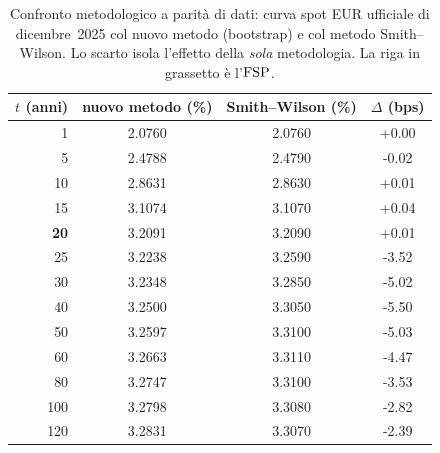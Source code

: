 \begin{table}[H]\centering\small
\caption{Confronto metodologico a parit\`a di dati: curva spot EUR ufficiale di dicembre~2025 col nuovo metodo (bootstrap) e col metodo Smith--Wilson. Lo scarto isola l'effetto della \emph{sola} metodologia. La riga in grassetto \`e l'$\mathrm{FSP}$.}
\label{tab:sw-vs-new-rivisto}\renewcommand{\arraystretch}{1.15}
\begin{tabular}{rccc}
\toprule
$t$ (anni) & nuovo metodo (\%) & Smith--Wilson (\%) & $\Delta$ (bps)\\
\midrule
\rowcolor{rowtint}1 & 2.0760 & 2.0760 & +0.00\\
5 & 2.4788 & 2.4790 & -0.02\\
\rowcolor{rowtint}10 & 2.8631 & 2.8630 & +0.01\\
15 & 3.1074 & 3.1070 & +0.04\\
\rowcolor{rowtint}\textbf{20} & 3.2091 & 3.2090 & +0.01\\
25 & 3.2238 & 3.2590 & -3.52\\
\rowcolor{rowtint}30 & 3.2348 & 3.2850 & -5.02\\
40 & 3.2500 & 3.3050 & -5.50\\
\rowcolor{rowtint}50 & 3.2597 & 3.3100 & -5.03\\
60 & 3.2663 & 3.3110 & -4.47\\
\rowcolor{rowtint}80 & 3.2747 & 3.3100 & -3.53\\
100 & 3.2798 & 3.3080 & -2.82\\
\rowcolor{rowtint}120 & 3.2831 & 3.3070 & -2.39\\
\bottomrule
\end{tabular}
\end{table}
